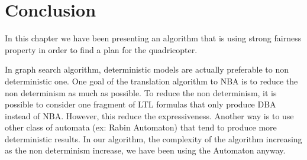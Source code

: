 
\section{Conclusion}
In this chapter we have been presenting an algorithm that is using strong fairness property in order to find a plan for the quadricopter.



In graph search algorithm, deterministic models are actually preferable to non deterministic one. One goal of the translation algorithm to NBA is to reduce the non determinism as much as possible. 
To reduce the non determinism, it is possible to consider one fragment of LTL formulas that only produce DBA instead of NBA.
However, this reduce the expressiveness. Another way is to use other class of automata (ex: Rabin Automaton) that tend to produce more deterministic results.
In our algorithm, the complexity of the algorithm increasing as the non determinism increase, we have been using the \buchi{} Automaton anyway.